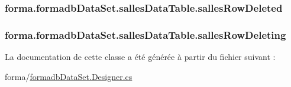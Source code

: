 \subsubsection[{\texorpdfstring{salles\+Row\+Deleted}{sallesRowDeleted}}]{ forma.\+formadb\+Data\+Set.\+salles\+Data\+Table.\+salles\+Row\+Deleted}\hypertarget{classforma_1_1formadb_data_set_1_1salles_data_table_a917ca0e092efbbf46c70883bb2ee5f6f}{}\label{classforma_1_1formadb_data_set_1_1salles_data_table_a917ca0e092efbbf46c70883bb2ee5f6f}
\subsubsection[{\texorpdfstring{salles\+Row\+Deleting}{sallesRowDeleting}}]{ forma.\+formadb\+Data\+Set.\+salles\+Data\+Table.\+salles\+Row\+Deleting}\hypertarget{classforma_1_1formadb_data_set_1_1salles_data_table_aed02e79222d451303738044c3c80cf99}{}\label{classforma_1_1formadb_data_set_1_1salles_data_table_aed02e79222d451303738044c3c80cf99}


La documentation de cette classe a été générée à partir du fichier suivant \+:\begin{DoxyCompactItemize}
\item 
forma/\hyperlink{formadb_data_set_8_designer_8cs}{formadb\+Data\+Set.\+Designer.\+cs}\end{DoxyCompactItemize}
